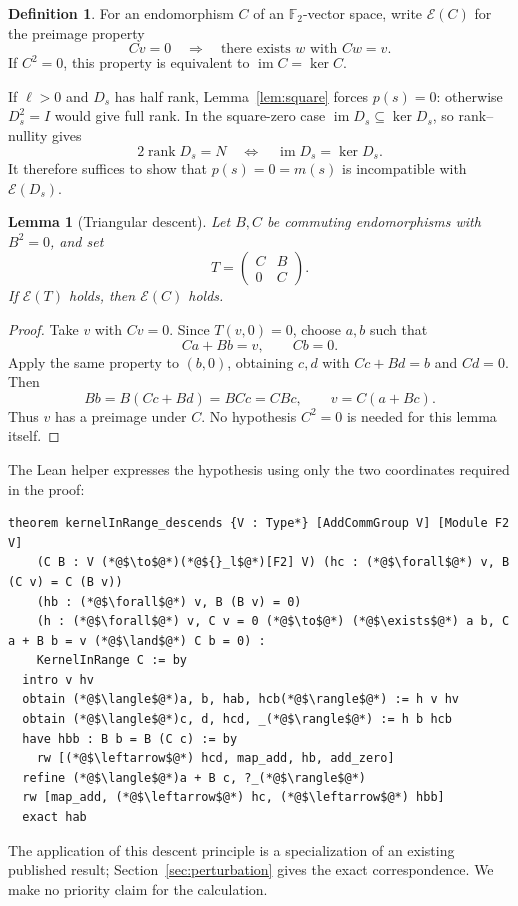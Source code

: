 \documentclass[11pt]{article}
\newtheorem{lemma}[theorem]{Lemma}
\theoremstyle{definition}
\newtheorem{definition}[theorem]{Definition}
\newcommand{\F}{\mathbb F_2}
\newcommand{\im}{\operatorname{im}}
\newcommand{\rk}{\operatorname{rank}}
\newcommand{\E}{\mathcal E}
\begin{document}
\begin{definition}
For an endomorphism $C$ of an $\F$-vector space, write $\E(C)$ for the preimage property
\[
 Cv=0\quad\Longrightarrow\quad \text{there exists }w\text{ with }Cw=v.
\]
If $C^2=0$, this property is equivalent to $\im C=\ker C$.
\end{definition}

If $\ell>0$ and $D_s$ has half rank, Lemma~\ref{lem:square} forces $p(s)=0$: otherwise $D_s^2=I$ would give full rank. In the square-zero case $\im D_s\subseteq\ker D_s$, so rank--nullity gives
\begin{equation}\label{eq:exact}
 2\rk D_s=N\quad\Longleftrightarrow\quad\im D_s=\ker D_s.
\end{equation}
It therefore suffices to show that $p(s)=0=m(s)$ is incompatible with $\E(D_s)$.

\begin{lemma}[Triangular descent]\label{lem:descent}
Let $B,C$ be commuting endomorphisms with $B^2=0$, and set
\[
 T=\begin{pmatrix}C&B\\0&C\end{pmatrix}.
\]
If $\E(T)$ holds, then $\E(C)$ holds.
\end{lemma}
\begin{proof}
Take $v$ with $Cv=0$. Since $T(v,0)=0$, choose $a,b$ such that
\[
 Ca+Bb=v,\qquad Cb=0.
\]
Apply the same property to $(b,0)$, obtaining $c,d$ with $Cc+Bd=b$ and $Cd=0$. Then
\[
 Bb=B(Cc+Bd)=BCc=CBc,
 \qquad v=C(a+Bc).
\]
Thus $v$ has a preimage under $C$. No hypothesis $C^2=0$ is needed for this lemma itself.
\end{proof}

The Lean helper expresses the hypothesis using only the two coordinates required in the proof:
\begin{lstlisting}[caption={Checked preimage calculation from Recursive.lean.}]
theorem kernelInRange_descends {V : Type*} [AddCommGroup V] [Module F2 V]
    (C B : V (*@$\to$@*)(*@${}_l$@*)[F2] V) (hc : (*@$\forall$@*) v, B (C v) = C (B v))
    (hb : (*@$\forall$@*) v, B (B v) = 0)
    (h : (*@$\forall$@*) v, C v = 0 (*@$\to$@*) (*@$\exists$@*) a b, C a + B b = v (*@$\land$@*) C b = 0) :
    KernelInRange C := by
  intro v hv
  obtain (*@$\langle$@*)a, b, hab, hcb(*@$\rangle$@*) := h v hv
  obtain (*@$\langle$@*)c, d, hcd, _(*@$\rangle$@*) := h b hcb
  have hbb : B b = B (C c) := by
    rw [(*@$\leftarrow$@*) hcd, map_add, hb, add_zero]
  refine (*@$\langle$@*)a + B c, ?_(*@$\rangle$@*)
  rw [map_add, (*@$\leftarrow$@*) hc, (*@$\leftarrow$@*) hbb]
  exact hab
\end{lstlisting}
The application of this descent principle is a specialization of an existing published result; Section~\ref{sec:perturbation} gives the exact correspondence. We make no priority claim for the calculation.
\end{document}
